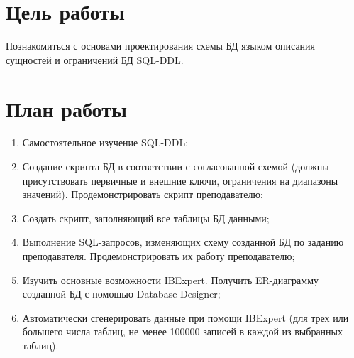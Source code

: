 \section{Цель работы}

Познакомиться с основами проектирования схемы БД языком описания сущностей и ограничений БД SQL-DDL.

\section{План работы}

\begin{enumerate}
	\item Самостоятельное изучение SQL-DDL;
	\item Создание скрипта БД в соответствии с согласованной схемой (должны присутствовать первичные и внешние ключи, ограничения на диапазоны значений). Продемонстрировать скрипт преподавателю;
	\item Создать скрипт, заполняющий все таблицы БД данными;
	\item Выполнение SQL-запросов, изменяющих схему созданной БД по заданию преподавателя. Продемонстрировать их работу преподавателю;
	\item Изучить основные возможности IBExpert. Получить ER-диаграмму созданной БД с помощью Database Designer;
	\item Автоматически сгенерировать данные при помощи IBExpert (для трех или большего числа таблиц, не менее 100000 записей в каждой из выбранных таблиц).
\end{enumerate}